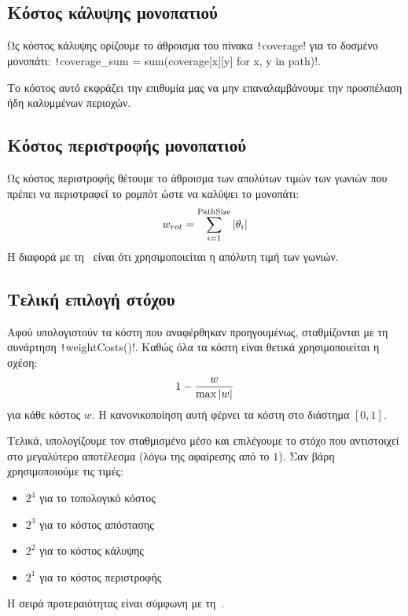 \subsection{Κόστος κάλυψης μονοπατιού}\label{section:coverage-cost}
\sloppy Ως κόστος κάλυψης ορίζουμε το άθροισμα του πίνακα \texttt!coverage! για το δοσμένο μονοπάτι:
\texttt!coverage_sum = sum(coverage[x][y] for x, y in path)!.

Το κόστος αυτό εκφράζει την επιθυμία μας να μην επαναλαμβάνουμε την προσπέλαση ήδη καλυμμένων περιοχών.

\subsection{Κόστος περιστροφής μονοπατιού}\label{section:rotation-cost}
Ως κόστος περιστροφής θέτουμε το άθροισμα των απολύτων τιμών των γωνιών που πρέπει να περιστραφεί το ρομπότ ώστε να καλύψει το μονοπάτι:
\begin{equation}
    w_{rot} = \sum_{i=1}^{\text{PathSize}} \left\lvert\theta_i\right\rvert
\end{equation}
Η διαφορά με τη~\cite{etsardou-phd} είναι ότι χρησιμοποιείται η απόλυτη τιμή των γωνιών.

\subsection{Τελική επιλογή στόχου}
Αφού υπολογιστούν τα κόστη που αναφέρθηκαν προηγουμένως, σταθμίζονται με τη συνάρτηση \texttt!weightCosts()!.
Καθώς όλα τα κόστη είναι θετικά χρησιμοποιείται η σχέση:
\begin{equation}
    1 - \frac{w}{\max{\left\lvert w\right\rvert}}
\end{equation}
για κάθε κόστος $w$.
Η κανονικοποίηση αυτή φέρνει τα κόστη στο διάστημα $\left[0, 1\right]$.

Τελικά, υπολογίζουμε τον σταθμισμένο μέσο και επιλέγουμε το στόχο που αντιστοιχεί στο μεγαλύτερο αποτέλεσμα (λόγω της αφαίρεσης από το $1$).
Σαν βάρη χρησιμοποιούμε τις τιμές:%
\begin{itemize}
    \item $2^4$ για το τοπολογικό κόστος
    \item $2^3$ για το κόστος απόστασης
    \item $2^2$ για το κόστος κάλυψης
    \item $2^1$ για το κόστος περιστροφής
\end{itemize}
Η σειρά προτεραιότητας είναι σύμφωνη με τη~\cite{etsardou-phd}.

